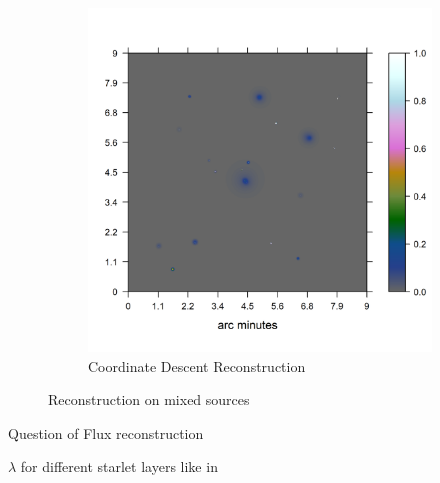 \begin{figure}[h]
\begin{subfigure}[b]{0.4\linewidth}
		\includegraphics[width=\linewidth, trim={0.2in, 0.2in, 0, 0.2in}, clip]{./chapters/20.results/mixed/mixed_cd.png}
		\caption{Coordinate Descent Reconstruction}
		\label{results:mixed:cd}
	\end{subfigure}
	\caption{Reconstruction on mixed sources}
	\label{results:mixed}
\end{figure}

Question of Flux reconstruction

 $\lambda$ for different starlet layers like in \cite{girard2015sparse}

